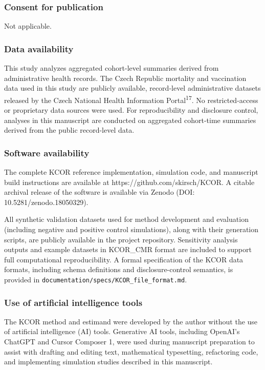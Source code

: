 \documentclass[
]{article}
\begin{document}
\subsubsection{Consent for publication}\label{consent-for-publication}

Not applicable.

\subsubsection{Data availability}\label{data-availability}

This study analyzes aggregated cohort-level summaries derived from
administrative health records. The Czech Republic mortality and
vaccination data used in this study are publicly available, record-level
administrative datasets released by the Czech National Health
Information Portal\textsuperscript{17}. No restricted-access or
proprietary data sources were used. For reproducibility and disclosure
control, analyses in this manuscript are conducted on aggregated
cohort-time summaries derived from the public record-level data.

\subsubsection{Software availability}\label{software-availability}

The complete KCOR reference implementation, simulation code, and
manuscript build instructions are available at
https://github.com/skirsch/KCOR. A citable archival release of the
software is available via Zenodo (DOI: 10.5281/zenodo.18050329).

All synthetic validation datasets used for method development and
evaluation (including negative and positive control simulations), along
with their generation scripts, are publicly available in the project
repository. Sensitivity analysis outputs and example datasets in
KCOR\_CMR format are included to support full computational
reproducibility. A formal specification of the KCOR data formats,
including schema definitions and disclosure-control semantics, is
provided in \texttt{documentation/specs/KCOR\_file\_format.md}.

\subsubsection{Use of artificial intelligence
tools}\label{use-of-artificial-intelligence-tools}

The KCOR method and estimand were developed by the author without the
use of artificial intelligence (AI) tools. Generative AI tools,
including OpenAI's ChatGPT and Cursor Composer 1, were used during
manuscript preparation to assist with drafting and editing text,
mathematical typesetting, refactoring code, and implementing simulation
studies described in this manuscript.
\end{document}

